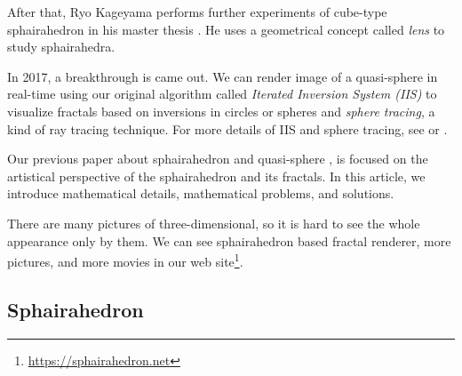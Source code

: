 \documentclass[suppldata, dvipdfmx]{interact}
\theoremstyle{plain}%
\theoremstyle{definition}
\theoremstyle{remark}
\theoremstyle{problemstyle}
\begin{document}
After that, Ryo Kageyama performs further experiments of
cube-type sphairahedron in his master thesis \cite{kageyama}. 
He uses a geometrical concept called \textit{lens} to study sphairahedra. 

In 2017, a breakthrough is came out. We can render image of a
quasi-sphere in real-time using our original algorithm called
\textit{Iterated Inversion System (IIS)} to visualize fractals based on
inversions in circles or spheres and \textit{sphere tracing}, a kind of
ray tracing technique.
For more details of IIS and sphere tracing, see \cite{bridges2016} or
\cite{bridges2017}.

Our previous paper about sphairahedron and quasi-sphere
\cite{bridges2018}, is focused on the artistical
perspective of the sphairahedron and its fractals.
In this article, we introduce mathematical details,
mathematical problems, and solutions. 

There are many pictures of three-dimensional, so it is hard to see the whole
appearance only by them. We can see sphairahedron based fractal renderer,
 more pictures, and more movies in
our web site\footnote{\url{https://sphairahedron.net}}.

\subsection{Sphairahedron}
\end{document}

